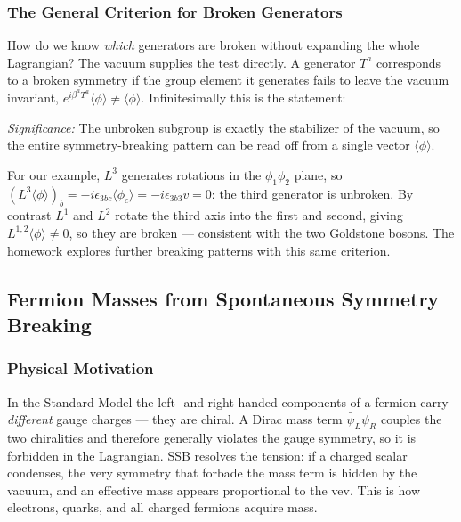 \subsubsection*{The General Criterion for Broken Generators}

How do we know \emph{which} generators are broken without expanding the whole Lagrangian? The vacuum supplies the test directly. A generator $T^a$ corresponds to a broken symmetry if the group element it generates fails to leave the vacuum invariant, $e^{i\beta^a T^a}\langle\phi\rangle\neq\langle\phi\rangle$. Infinitesimally this is the statement:


\textit{Significance:} The unbroken subgroup is exactly the stabilizer of the vacuum, so the entire symmetry-breaking pattern can be read off from a single vector $\langle\phi\rangle$.

For our example, $L^3$ generates rotations in the $\phi_1\phi_2$ plane, so $(L^3\langle\phi\rangle)_b=-i\epsilon_{3bc}\langle\phi_c\rangle=-i\epsilon_{3b3}v=0$: the third generator is unbroken. By contrast $L^1$ and $L^2$ rotate the third axis into the first and second, giving $L^{1,2}\langle\phi\rangle\neq0$, so they are broken --- consistent with the two Goldstone bosons. The homework explores further breaking patterns with this same criterion.

\subsection{Fermion Masses from Spontaneous Symmetry Breaking}\label{subsec:lec16:fermion-mass}

\subsubsection*{Physical Motivation}

In the Standard Model the left- and right-handed components of a fermion carry \emph{different} gauge charges --- they are chiral. A Dirac mass term $\bar\psi_L\psi_R$ couples the two chiralities and therefore generally violates the gauge symmetry, so it is forbidden in the Lagrangian. SSB resolves the tension: if a charged scalar condenses, the very symmetry that forbade the mass term is hidden by the vacuum, and an effective mass appears proportional to the vev. This is how electrons, quarks, and all charged fermions acquire mass.

